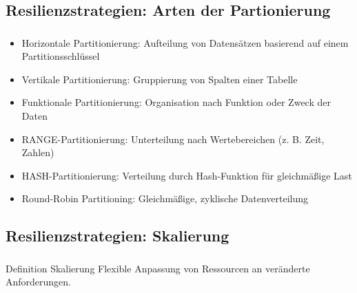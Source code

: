 \subsection{Resilienzstrategien: Arten der Partionierung}
\begin{frame}
    \frametitle{\insertsection}
    \framesubtitle{\insertsubsection}
        \begin{itemize}
            \item Horizontale Partitionierung: Aufteilung von Datensätzen basierend auf einem Partitionsschlüssel
            \item Vertikale Partitionierung: Gruppierung von Spalten einer Tabelle
            \item Funktionale Partitionierung: Organisation nach Funktion oder Zweck der Daten
            \item RANGE-Partitionierung: Unterteilung nach Wertebereichen (z. B. Zeit, Zahlen)
            \item HASH-Partitionierung: Verteilung durch Hash-Funktion für gleichmäßige Last
            \item Round-Robin Partitioning: Gleichmäßige, zyklische Datenverteilung
        \end{itemize}
\end{frame}



\subsection{Resilienzstrategien: Skalierung}
\begin{frame}
    \frametitle{\insertsection}
    \framesubtitle{\insertsubsection}

    \begin{block}{Definition Skalierung}
Flexible Anpassung von Ressourcen an veränderte Anforderungen.
    \end{block}
\end{frame}

